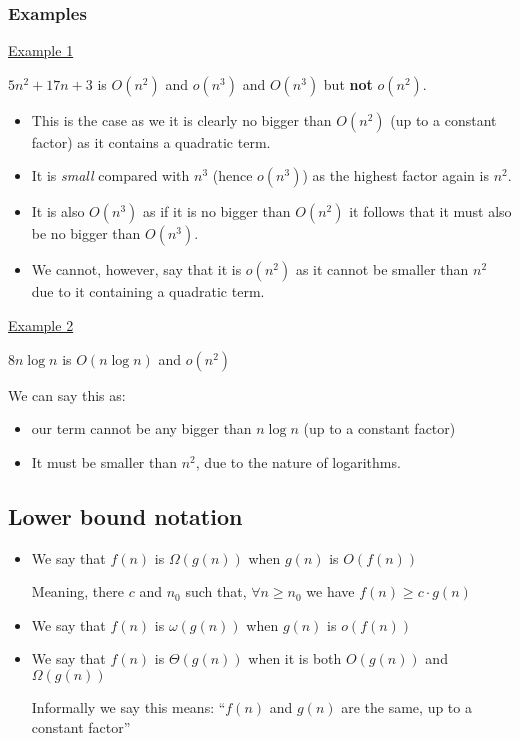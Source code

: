 \documentclass{article}
\begin{document}
\subsubsection{Examples}

\underline{Example 1}

$  5n^{2} + 17n + 3$ is $O(n^{2})$ and $o(n^{3})$ and $O(n^{3})$ but \textbf{not} $o(n^{2})$.

\begin{itemize}
  \item This is the case as we it is clearly no bigger than $O(n^{2})$ (up to a constant factor) as it contains a quadratic term.
  \item It is \textit{small} compared with $n^{3}$ (hence $o(n^{3})$) as the highest factor again is $n^{2}$.
  \item It is also $O(n^{3})$ as if it is no bigger than $O(n^{2})$ it follows that it must also be no bigger than $O(n^{3})$.
  \item We cannot, however, say that it is $o(n^{2})$ as it cannot be smaller than $n^{2}$ due to it containing a quadratic term.
\end{itemize}

\underline{Example 2}

$8n\log n$ is $O(n\log n)$ and $o(n^{2})$

We can say this as:

\begin{itemize}
  \item our term cannot be any bigger than $n\log n$ (up to a constant factor)
        \item It must be smaller than $n^{2}$, due to the nature of logarithms.
\end{itemize}

\subsection{Lower bound notation}

\begin{itemize}
  \item We say that $f(n)$ is $\Omega(g(n))$ when $g(n)$ is $O(f(n))$

        Meaning, there $c$ and $n_{0}$ such that, $\forall n \geq n_{0}$ we have $f(n) \geq c \cdot g(n)$
  \item We say that $f(n)$ is $\omega(g(n))$ when $g(n)$ is $o(f(n))$
  \item We say that $f(n)$ is $\Theta(g(n))$ when it is both $O(g(n))$ and $\Omega(g(n))$

        Informally we say this means: ``$f(n)$ and $g(n)$ are the same, up to a constant factor''
\end{itemize}
\end{document}
